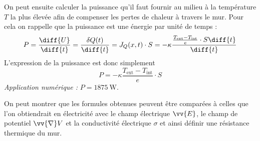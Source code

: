\documentclass[a4paper,12pt]{article}
\begin{document}
On peut ensuite calculer la puissance qu'il faut fournir au milieu à la température $T$ la plus élevée afin de compenser les pertes de chaleur à travers le mur. Pour cela on rappelle que la puissance est une énergie par unité de temps :
\begin{equation}
	P = \frac{\diff{U}}{\diff{t}} = \frac{\delta Q(t)}{\diff{t}} = J_Q (x,t) \cdot S = - \kappa \frac{\frac{T_\text{ext} - T_\text{int}}{e} \cdot S \diff{t}}{\diff{t}}
\end{equation}
L'expression de la puissance est donc simplement
\begin{equation}
	P = - \kappa \frac{T_\text{ext} - T_\text{int}}{e} \cdot S
\end{equation}
\emph{Application numérique :} $P = \SI{1875}{\watt}$.

On peut montrer que les formules obtenues peuvent être comparées à celles que l'on obtiendrait en électricité avec le champ électrique $\vv{E}$, le champ de potentiel $\vv{\nabla} V$ et la conductivité électrique $\sigma$ et ainsi définir une \og résistance thermique \fg{} du mur.
\end{document}
